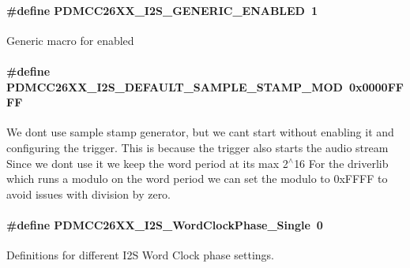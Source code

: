 \paragraph[{P\+D\+M\+C\+C26\+X\+X\+\_\+\+I2\+S\+\_\+\+G\+E\+N\+E\+R\+I\+C\+\_\+\+E\+N\+A\+B\+L\+E\+D}]{\setlength{\rightskip}{0pt plus 5cm}\#define P\+D\+M\+C\+C26\+X\+X\+\_\+\+I2\+S\+\_\+\+G\+E\+N\+E\+R\+I\+C\+\_\+\+E\+N\+A\+B\+L\+E\+D~1}\label{_p_d_m_c_c26_x_x__util_8h_a7addf5824e414ed59a40c360b8497fad}
Generic macro for enabled 
\paragraph[{P\+D\+M\+C\+C26\+X\+X\+\_\+\+I2\+S\+\_\+\+D\+E\+F\+A\+U\+L\+T\+\_\+\+S\+A\+M\+P\+L\+E\+\_\+\+S\+T\+A\+M\+P\+\_\+\+M\+O\+D}]{\setlength{\rightskip}{0pt plus 5cm}\#define P\+D\+M\+C\+C26\+X\+X\+\_\+\+I2\+S\+\_\+\+D\+E\+F\+A\+U\+L\+T\+\_\+\+S\+A\+M\+P\+L\+E\+\_\+\+S\+T\+A\+M\+P\+\_\+\+M\+O\+D~0x0000\+F\+F\+F\+F}\label{_p_d_m_c_c26_x_x__util_8h_a49eaea1595b37d242a7788a20396aaa3}
We don\textquotesingle{}t use sample stamp generator, but we can\textquotesingle{}t start without enabling it and configuring the trigger. This is because the trigger also starts the audio stream Since we don\textquotesingle{}t use it we keep the word period at its max 2$^\wedge$16 For the driverlib which runs a modulo on the word period we can set the modulo to 0x\+F\+F\+F\+F to avoid issues with division by zero. 
\paragraph[{P\+D\+M\+C\+C26\+X\+X\+\_\+\+I2\+S\+\_\+\+Word\+Clock\+Phase\+\_\+\+Single}]{\setlength{\rightskip}{0pt plus 5cm}\#define P\+D\+M\+C\+C26\+X\+X\+\_\+\+I2\+S\+\_\+\+Word\+Clock\+Phase\+\_\+\+Single~0}\label{_p_d_m_c_c26_x_x__util_8h_ad5e97275f3d868adfea67f33b08a2632}
Definitions for different I2\+S Word Clock phase settings.

